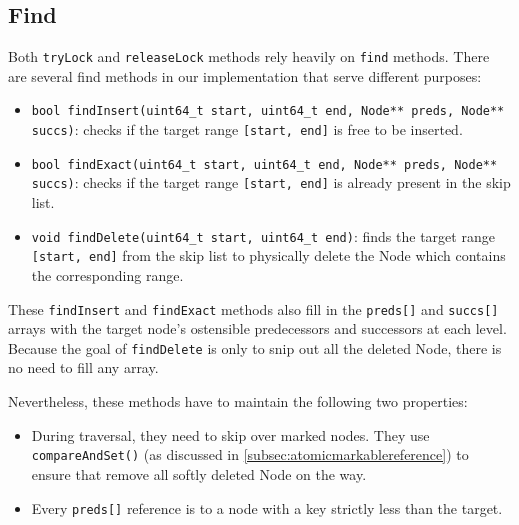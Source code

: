 \subsection{Find}\label{subsec:find}

Both \texttt{tryLock} and \texttt{releaseLock} methods rely heavily on \texttt{find} methods.
There are several find methods in our implementation that serve different purposes:

\begin{itemize}
    \item \texttt{bool findInsert(uint64\_t start, uint64\_t end, Node** preds, Node** succs)}: checks if the target range \texttt{[start, end]} is free to be inserted.
    
    \item \texttt{bool findExact(uint64\_t start, uint64\_t end, Node** preds, Node** succs)}: checks if the target range \texttt{[start, end]} is already present in the skip list.
    
    \item \texttt{void findDelete(uint64\_t start, uint64\_t end)}: finds the target range \texttt{[start, end]} from the skip list to physically delete the Node which contains the corresponding range.
\end{itemize}

These \texttt{findInsert} and \texttt{findExact} methods also fill in the \texttt{preds[]} and \texttt{succs[]} arrays with the target node's ostensible predecessors and successors at each level.
Because the goal of \texttt{findDelete} is only to snip out all the deleted Node, there is no need to fill any array.

Nevertheless, these methods have to maintain the following two properties:

\begin{itemize}
    \item During traversal, they need to skip over marked nodes.
    They use \texttt{compareAndSet()} (as discussed in \ref{subsec:atomicmarkablereference}) to ensure that remove all softly deleted Node on the way.
    \item Every \texttt{preds[]} reference is to a node with a key strictly less than the target.
\end{itemize}

